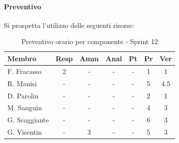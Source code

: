 \documentclass[a4paper,12pt]{article}
\begin{document}
\paragraph{Preventivo}
Si prospetta l'utilizzo delle seguenti risorse:
\begin{table}[H]
    \centering
    \renewcommand{\arraystretch}{1.3}
    \small 
    \begin{tabularx}{\textwidth}{|l|C|C|C|C|C|C|}
        \hline
        \textbf{Membro} & \textbf{Resp} & \textbf{Amm} & \textbf{Anal} & \textbf{Pt} & \textbf{Pr} & \textbf{Ver} \\
        \hline
        F. Fracasso & 2 & - & - & - & 1 & 1 \\
        \hline
        R. Manisi & - & - & - & - & 5 & 4.5 \\
        \hline
        D. Parolin & - & - & - & - & 2 & 1 \\
        \hline
        M. Sanguin & - & - & - & - & 4 & 3 \\
        \hline
        G. Scaggiante & - & - & - & - & 6 & 3 \\
        \hline
        G. Visentin & - & 3 & - & - & 5 & 3 \\
        \hline
    \end{tabularx}
    \caption{Preventivo orario per componente - Sprint 12}
    \label{tab:preventivo_sprint12}
\end{table}
\end{document}
